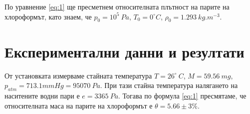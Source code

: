 \documentclass[%
 reprint,
 amsmath,amssymb,
 aps,
]{revtex4-2}
\newcommand{\degree}{^{\circ}}
\begin{document}
По уравнение \eqref{eq:1} ще пресметнем относителната плътност на парите на хлороформът, като знаем, че $p_0 = 10^5 \ Pa$, $T_0 = 0\degree C$, $\rho_0 = 1.293 \ \si{kg.m^{-3}}$.

\section{Експериментални данни и резултати}

От установката измерваме стайната температура $T = 26\degree \ C$, $M = 59.56 \ \si{mg}$, $p_{atm} = 713.1 \si{mmHg} = 95070 \ \si{Pa}$. При тази стайна температура налягането на наситените водни пари е $e = 3365 \ \si{Pa}$. Тогава по формула \eqref{eq:1} пресмятаме, че относителната маса на парите на хлороформът е $\theta = 5.66 \pm 3\%$.
\end{document}
